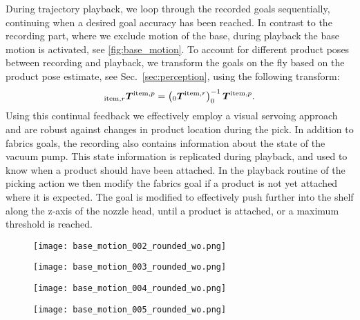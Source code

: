 During trajectory playback, we loop through the recorded goals sequentially, continuing when a desired goal accuracy has been reached. 
In contrast to the recording part, where
we exclude motion of the base, during playback the base motion is activated, see \cref{fig:base_motion}.
To account for different product poses
between recording and playback, we transform the goals on the fly based on the product pose estimate, see Sec.~\ref{sec:perception}, using the following transform:
\[
  _{\textrm{item},r}\bm{T}^{\textrm{item},p} =
  \left(_{0}\bm{T}^{\textrm{item},r}\right)^{-1}_{0}\bm{T}^{\textrm{item},p}.
\]
Using this continual feedback we effectively employ a visual servoing \cite{kmich2022image} approach and are robust against changes in product location during the pick.
In addition to \ac{fabrics} goals, the recording also contains information about the state of the vacuum pump. This state information is replicated during playback, and used to know when a product should have been attached.
In the playback routine of the picking action we then modify the fabrics goal if a product is not yet attached where it is expected. The goal is modified to effectively push further into the shelf along the z-axis of the nozzle head, until a product is attached, or a maximum threshold is reached.
\begin{figure*}[t]
  \centering
  \begin{subfigure}[b]{0.20\linewidth}
    \centering
    \texttt{[image: base\_motion\_002\_rounded\_wo.png]}
    \caption{}
    \label{subfig:base_motion_1}
  \end{subfigure}
  \begin{subfigure}[b]{0.20\linewidth}
    \centering
    \texttt{[image: base\_motion\_003\_rounded\_wo.png]}
    \caption{}
    \label{subfig:base_motion_2}
  \end{subfigure}
  \begin{subfigure}[b]{0.20\linewidth}
    \centering
    \texttt{[image: base\_motion\_004\_rounded\_wo.png]}
    \caption{}
    \label{subfig:base_motion_3}
  \end{subfigure}
  \begin{subfigure}[b]{0.20\linewidth}
    \centering
    \texttt{[image: base\_motion\_005\_rounded\_wo.png]}
    \caption{}
    \label{subfig:base_motion_4}
  \end{subfigure}
  \caption{During playback, \ac{fabrics}  actively use the base's forward motion as a prismatic joint to compensate for misplacement during navigation.}
  \label{fig:base_motion}
\end{figure*}

